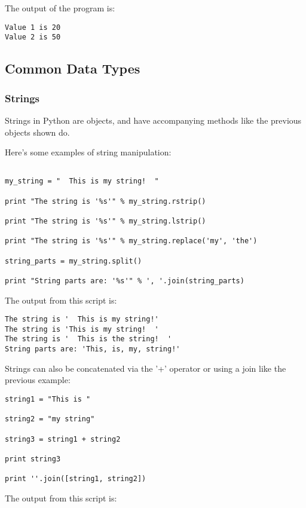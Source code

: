 \documentclass[12pt]{article}
\begin{document}
The output of the program is:

\begin{verbatim}
Value 1 is 20
Value 2 is 50
\end{verbatim}

\subsection*{Common Data Types}

\subsubsection*{Strings}

Strings in Python are objects, and have accompanying methods like the previous objects shown do. 

Here's some examples of string manipulation:
\begin{verbatim}

my_string = "  This is my string!  "

print "The string is '%s'" % my_string.rstrip()

print "The string is '%s'" % my_string.lstrip()

print "The string is '%s'" % my_string.replace('my', 'the')

string_parts = my_string.split()

print "String parts are: '%s'" % ', '.join(string_parts)

\end{verbatim}

The output from this script is:
\begin{verbatim}
The string is '  This is my string!'
The string is 'This is my string!  '
The string is '  This is the string!  '
String parts are: 'This, is, my, string!'
\end{verbatim}


Strings can also be concatenated via the '+' operator or using a join like the previous example:

\begin{verbatim}
string1 = "This is "

string2 = "my string"

string3 = string1 + string2

print string3

print ''.join([string1, string2])
\end{verbatim}



The output from this script is:
\end{document}
